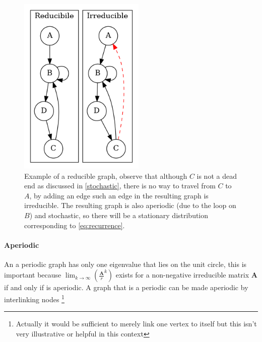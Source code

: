 \documentclass[11pt]{article}
\begin{document}
\begin{figure}[htbp]
\centering
\includegraphics[width=6cm]{media/dot/reducible_graph_example.dot.png}
\caption{\label{irreducible-example}Example of a reducible graph, observe that although \(C\) is not a dead end as discussed in \ref{stochastic}, there is no way to travel from \(C\) to \(A\), by adding an edge such an edge in the resulting graph is irreducible. The resulting graph is also aperiodic (due to the loop on \(B\)) and stochastic, so there will be a stationary distribution corresponding to \eqref{eq:recurrence}.}
\end{figure}

\paragraph{Aperiodic}
\label{sec:org37a19ad}
An a periodic graph has only one eigenvalue that lies on the unit circle, this is important because \(\lim_{k\rightarrow \infty} \left( \frac{\mathbf{A}}{r}^{k} \right)\) exists for a non-negative irreducible matrix \(\mathbf{A}\) if and only if  is aperiodic. A graph that is a periodic can be made aperiodic by interlinking nodes \footnote{Actually it would be sufficient to merely link one vertex to itself \cite[]{langvilleGooglePageRankScience2012} but this isn't very illustrative or helpful in this context}
\end{document}
